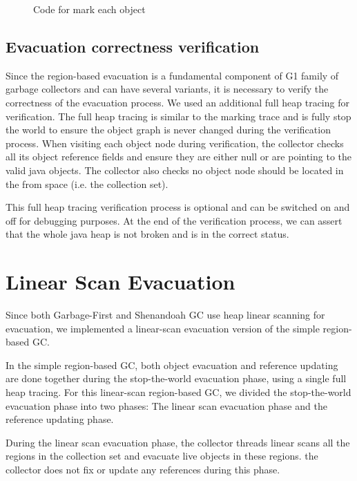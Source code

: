 \begin{figure}
  \centering
  
  \caption{Code for mark each object}
  \label{fig:traceevacuateobject}
\end{figure}

\subsection{Evacuation correctness verification}

Since the region-based evacuation is a fundamental component of G1 family of garbage collectors
and can have several variants, it is necessary to verify the correctness of the evacuation process.
We used an additional full heap tracing for verification. The full heap tracing is
similar to the marking trace and is fully stop the world to ensure the object graph is never changed
during the verification process.
When visiting each object node during verification, the collector checks all its object reference fields
and ensure they are either null or are pointing to the valid java objects.
The collector also checks no object node should be located in the from space (i.e. the collection set).

This full heap tracing verification process is optional and can be switched on and off for
debugging purposes.
At the end of the verification process, we can assert that the whole java heap is
not broken and is in the correct status.

\section{Linear Scan Evacuation}
\label{sec:linearscangc}

Since both Garbage-First and Shenandoah GC use heap linear scanning for evacuation,
we implemented a linear-scan evacuation version of the simple region-based GC.

In the simple region-based GC, both object evacuation and reference updating are
done together during the stop-the-world evacuation phase, using a single full heap tracing.
For this linear-scan region-based GC, we divided the stop-the-world evacuation phase into
two phases: The linear scan evacuation phase and the reference updating phase.

During the linear scan evacuation phase, the collector threads linear scans all the regions
in the collection set and evacuate live objects in these regions. the collector does not
fix or update any references during this phase.

